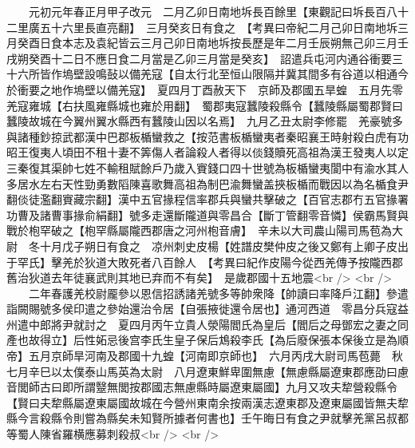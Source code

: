 　　元初元年春正月甲子改元　二月乙卯日南地坼長百餘里【東觀記曰坼長百八十二里廣五十六里長直亮翻】　三月癸亥日有食之　【考異曰帝紀二月己卯日南地坼三月癸酉日食本志及袁紀皆云三月己卯日南地坼按長歷是年二月壬辰朔無己卯三月壬戌朔癸酉十二日不應日食二月當是乙卯三月當是癸亥】　詔遣兵屯河内通谷衝要三十六所皆作塢壁設鳴鼔以備羌寇【自太行北至恒山限隔并冀其間多有谷道以相通今於衝要之地作塢壁以備羌寇】　夏四月丁酉赦天下　京師及郡國五旱蝗　五月先零羌寇雍城【右扶風雍縣城也雍於用翻】　蜀郡夷寇蠶陵殺縣令【蠶陵縣屬蜀郡賢曰蠶陵故城在今翼州翼水縣西有蠶陵山因以名焉】　九月乙丑太尉李修罷　羌豪號多與諸種鈔掠武都漢中巴郡板楯蠻救之【按范書板楯蠻夷者秦昭襄王時射殺白虎有功昭王復夷人頃田不租十妻不筭傷人者論殺人者得以倓錢贖死高祖為漢王發夷人以定三秦復其渠帥七姓不輸租賦餘戶乃歲入賨錢口四十世號為板楯蠻夷閬中有渝水其人多居水左右天性勁勇數䧟陳喜歌舞高祖為制巴渝舞蠻盖挾板楯而戰因以為名楯食尹翻倓徒濫翻賨藏宗翻】漢中五官掾程信率郡兵與蠻共擊破之【百官志郡冇五官掾署功曹及諸曹事掾俞絹翻】號多走還斷隴道與零昌合【斷丁管翻零音憐】侯霸馬賢與戰於枹罕破之【枹罕縣屬隴西郡唐之河州枹音膚】　辛未以大司農山陽司馬苞為大尉　冬十月戊子朔日有食之　凉州刺史皮楊【姓譜皮樊仲皮之後又鄭有上卿子皮出于罕氏】擊羌於狄道大敗死者八百餘人　【考異曰紀作皮陽今從西羌傳予按隴西郡舊治狄道去年徒襄武則其地已弃而不有矣】　是歲郡國十五地震<br />
<br />
　　二年春護羌校尉龎參以恩信招誘諸羌號多等帥衆降【帥讀曰率降戶江翻】參遣詣闕賜號多侯印遣之參始還治令居【自張掖徙還令居也】通河西道　零昌分兵寇益州遣中郎將尹就討之　夏四月丙午立貴人滎陽閻氏為皇后【閻后之母鄧宏之妻之同產也故得立】后性妬忌後宫李氏生皇子保后鴆殺李氏【為后廢保張本保後立是為順帝】五月京師旱河南及郡國十九蝗【河南即京師也】　六月丙戌大尉司馬苞薨　秋七月辛巳以太僕泰山馬英為太尉　八月遼東鮮卑圍無慮【無慮縣屬遼東郡應劭曰慮音閭師古曰即所謂毉無閭按郡國志無慮縣時屬遼東屬國】九月又攻夫犂營殺縣令【賢曰夫犂縣屬遼東屬國故城在今營州東南余按兩漢志遼東郡及遼東屬國皆無夫犂縣今言殺縣令則嘗為縣矣未知賢所據者何書也】壬午晦日有食之尹就擊羌黨呂叔都等蜀人陳省羅横應募刺殺叔<br />
<br />
